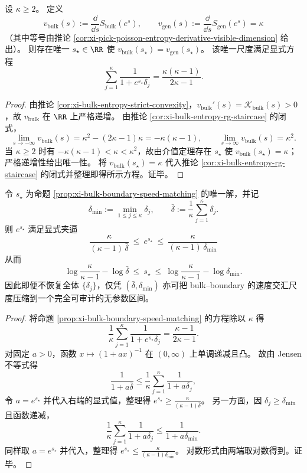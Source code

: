 \begin{proposition}\label{prop:xi-bulk-boundary-speed-matching}
设 \(\kappa\ge 2\)。
定义
\[
v_{\mathrm{bulk}}(s):=\frac{\dd}{\dd s}S_{\mathrm{bulk}}(e^s),
\qquad
v_{\mathrm{gen}}(s):=\frac{\dd}{\dd s}S_{\mathrm{gen}}(e^s)=\kappa
\]
（其中等号由推论 \ref{cor:xi-pick-poisson-entropy-derivative-visible-dimension} 给出）。
则存在唯一 \(s_\star\in\RR\) 使 \(v_{\mathrm{bulk}}(s_\star)=v_{\mathrm{gen}}(s_\star)\)。
该唯一尺度满足显式方程
\[
\boxed{\;
\sum_{j=1}^{\kappa}\frac{1}{1+e^{s_\star}\delta_j}=\frac{\kappa(\kappa-1)}{2\kappa-1}.\;}
\]
\end{proposition}
\begin{proof}
由推论 \ref{cor:xi-bulk-entropy-strict-convexity}，\(v_{\mathrm{bulk}}'(s)=\mathcal{K}_{\mathrm{bulk}}(s)>0\)，故 \(v_{\mathrm{bulk}}\) 在 \(\RR\) 上严格递增。
由推论 \ref{cor:xi-bulk-entropy-rg-staircase} 的闭式，
\[
\lim_{s\to-\infty}v_{\mathrm{bulk}}(s)=\kappa^2-(2\kappa-1)\kappa=-\kappa(\kappa-1),
\qquad
\lim_{s\to\infty}v_{\mathrm{bulk}}(s)=\kappa^2.
\]
当 \(\kappa\ge 2\) 时有 \(-\kappa(\kappa-1)<\kappa<\kappa^2\)，故由介值定理存在 \(s_\star\) 使 \(v_{\mathrm{bulk}}(s_\star)=\kappa\)；严格递增性给出唯一性。
将 \(v_{\mathrm{bulk}}(s_\star)=\kappa\) 代入推论 \ref{cor:xi-bulk-entropy-rg-staircase} 的闭式并整理即得所示方程。证毕。
\end{proof}

\begin{corollary}\label{cor:xi-bulk-boundary-speed-matching-scale-bracketing}
令 \(s_\star\) 为命题 \ref{prop:xi-bulk-boundary-speed-matching} 的唯一解，并记
\[
\delta_{\min}:=\min_{1\le j\le\kappa}\delta_j,
\qquad
\bar\delta:=\frac{1}{\kappa}\sum_{j=1}^{\kappa}\delta_j.
\]
则 \(e^{s_\star}\) 满足显式夹逼
\[
\boxed{\;
\frac{\kappa}{(\kappa-1)\,\bar\delta}\ \le\ e^{s_\star}\ \le\ \frac{\kappa}{(\kappa-1)\,\delta_{\min}}\;}
\]
从而
\[
\log\frac{\kappa}{\kappa-1}-\log\bar\delta\ \le\ s_\star\ \le\ \log\frac{\kappa}{\kappa-1}-\log\delta_{\min}.
\]
因此即便不恢复全体 \(\{\delta_j\}\)，仅凭 \((\bar\delta,\delta_{\min})\) 亦可把 bulk--boundary 的速度交汇尺度压缩到一个完全可审计的无参数区间。
\end{corollary}
\begin{proof}
将命题 \ref{prop:xi-bulk-boundary-speed-matching} 的方程除以 \(\kappa\) 得
\[
\frac{1}{\kappa}\sum_{j=1}^{\kappa}\frac{1}{1+e^{s_\star}\delta_j}=\frac{\kappa-1}{2\kappa-1}.
\]
对固定 \(a>0\)，函数 \(x\mapsto (1+ax)^{-1}\) 在 \((0,\infty)\) 上单调递减且凸。
故由 Jensen 不等式得
\[
\frac{1}{1+a\bar\delta}\le \frac{1}{\kappa}\sum_{j=1}^{\kappa}\frac{1}{1+a\delta_j},
\]
令 \(a=e^{s_\star}\) 并代入右端的显式值，整理得
\(
e^{s_\star}\ge \frac{\kappa}{(\kappa-1)\bar\delta}
\)。
另一方面，因 \(\delta_j\ge \delta_{\min}\) 且函数递减，
\[
\frac{1}{\kappa}\sum_{j=1}^{\kappa}\frac{1}{1+a\delta_j}\le \frac{1}{1+a\delta_{\min}}.
\]
同样取 \(a=e^{s_\star}\) 并代入，整理得
\(
e^{s_\star}\le \frac{\kappa}{(\kappa-1)\delta_{\min}}
\)。
对数形式由两端取对数得到。证毕。
\end{proof}

